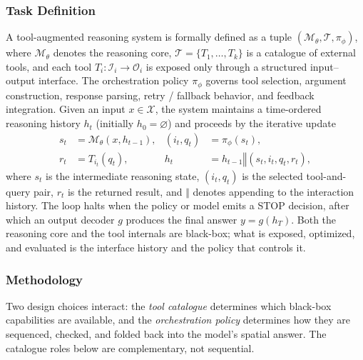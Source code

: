 \subsubsection{Task Definition}
A tool-augmented reasoning system is formally defined as a tuple $(\mathcal{M}_\theta, \mathcal{T}, \pi_\phi)$, where $\mathcal{M}_\theta$ denotes the reasoning core, $\mathcal{T} = \{T_1, \dots, T_k\}$ is a catalogue of external tools, and each tool $T_i : \mathcal{I}_i \rightarrow \mathcal{O}_i$ is exposed only through a structured input--output interface.
The orchestration policy $\pi_\phi$ governs tool selection, argument construction, response parsing, retry / fallback behavior, and feedback integration.
Given an input $x \in \mathcal{X}$, the system maintains a time-ordered reasoning history $h_t$ (initially $h_0 = \varnothing$) and proceeds by the iterative update
\begin{equation}
\begin{aligned}
s_t &= \mathcal{M}_\theta(x, h_{t-1}), &
(i_t, q_t) &= \pi_\phi(s_t), \\
r_t &= T_{i_t}(q_t), &
h_t &= h_{t-1} \mathbin{\Vert} (s_t, i_t, q_t, r_t),
\end{aligned}
\end{equation}
where $s_t$ is the intermediate reasoning state, $(i_t, q_t)$ is the selected tool-and-query pair, $r_t$ is the returned result, and $\Vert$ denotes appending to the interaction history.
The loop halts when the policy or model emits a STOP decision, after which an output decoder $g$ produces the final answer $y = g(h_T)$.
Both the reasoning core and the tool internals are black-box; what is exposed, optimized, and evaluated is the interface history and the policy that controls it.

\subsubsection{Methodology}
Two design choices interact: the \emph{tool catalogue} determines which black-box capabilities are available, and the \emph{orchestration policy} determines how they are sequenced, checked, and folded back into the model's spatial answer.
The catalogue roles below are complementary, not sequential.

